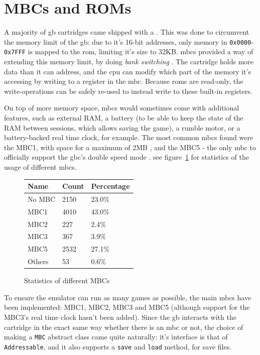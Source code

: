 \documentclass[11pt]{informatics-report}
\begin{document}
\section{MBCs and ROMs}

A majority of \gls{gb} cartridges came shipped with a . This was done to circumvent the memory limit of the \gls{gb}: due to it's 16-bit addresses, only memory in \texttt{0x0000}-\texttt{0x7FFF} is mapped to the \gls{rom}, limiting it's size to 32KB. \glspl{mbc} provided a way of extending this memory limit, by doing \textit{bank switching} \cite[MBCs]{pandoc}. The cartridge holds more data than it can address, and the \gls{cpu} can modify which part of the memory it's accessing by writing to a register in the \gls{mbc}. Because \glspl{rom} are read-only, the write-operations can be safely re-used to instead write to these built-in registers.

On top of more memory space, \glspl{mbc} would sometimes come with additional features, such as external RAM, a battery (to be able to keep the state of the RAM between sessions, which allows saving the game), a rumble motor, or a battery-backed real time clock, for example. The most common \glspl{mbc} found were the MBC1, with space for a maximum of 2MB \cite[MBC1]{pandoc}, and the MBC5 - the only \gls{mbc} to officially support the \gls{gbc}'s double speed mode \cite{mbc5_only_double}. see figure~\ref{fig:stats-mbc} for statistics of the usage of different \glspl{mbc}.

\begin{figure}[h]
    \centering
    \begin{tabular}{|l|l|l|}
    \hline
    \textbf{Name} & \textbf{Count} & \textbf{Percentage} \\ \hline
    No MBC & 2150 & 23.0\% \\ \hline
    MBC1   & 4010 & 43.0\% \\ \hline
    MBC2   &  227 &  2.4\% \\ \hline
    MBC3   &  367 &  3.9\% \\ \hline
    MBC5   & 2532 & 27.1\% \\ \hline
    Others &   53 &  0.6\% \\ \hline
    \end{tabular}
       \caption{Statistics of different MBCs \cite{gb_rom_db}}
    \label{fig:stats-mbc}
\end{figure}

To ensure the emulator can run as many games as possible, the main \glspl{mbc} have been implemented: MBC1, MBC2, MBC3 and MBC5 (although support for the MBC3's real time clock hasn't been added). Since the \gls{gb} interacts with the cartridge in the exact same way whether there is an \gls{mbc} or not, the choice of making a \texttt{MBC} abstract class came quite naturally: it's interface is that of \texttt{Addressable}, and it also supports a \texttt{save} and \texttt{load} method, for save files.
\end{document}
